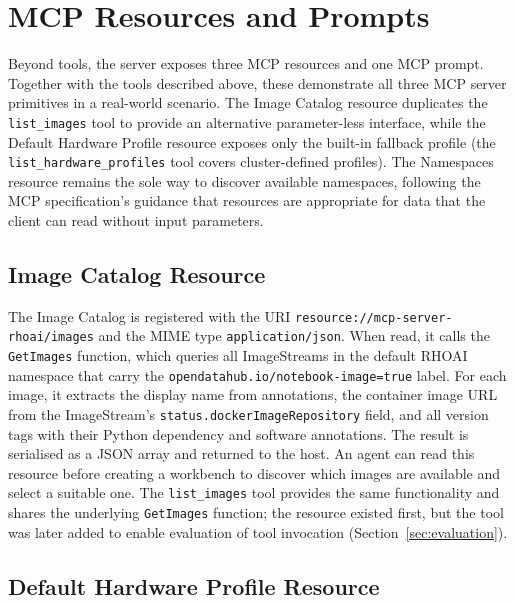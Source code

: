 \documentclass[
  digital,     %
  oneside,     %
  nosansbold,  %
  nocolorbold, %
  lof,         %
  lot,         %
]{fithesis4}
\begin{document}
\section{MCP Resources and Prompts}
\label{sec:resources-prompts}

Beyond tools, the server exposes three MCP resources and one MCP prompt.
Together with the tools described above, these demonstrate all three
MCP server primitives in a real-world scenario. The Image Catalog
resource duplicates the \texttt{list\_images} tool to provide an
alternative parameter-less interface, while the Default Hardware Profile
resource exposes only the built-in fallback profile (the
\texttt{list\_hardware\_profiles} tool covers cluster-defined profiles).
The Namespaces resource remains the sole way to discover available
namespaces, following the MCP specification's guidance that resources
are appropriate for data that the client can read without input
parameters.

\subsection{Image Catalog Resource}
\label{subsec:image-catalog}

\begin{sloppypar}
The Image Catalog is registered with the URI
\texttt{resource://mcp-server-rhoai/\allowbreak images} and the MIME type
\texttt{application/json}. When read, it calls the
\texttt{GetImages} function, which queries all ImageStreams in the default
RHOAI namespace that carry the \texttt{opendatahub.io/\allowbreak notebook-image=true}
label. For each image, it extracts the display name from annotations, the
container image URL from the ImageStream's \texttt{status.docker\-Image\-Repository}
field, and all version tags with their Python dependency and software
annotations. The result is serialised as a JSON array and returned to the
host. An agent can read this resource before creating a workbench to
discover which images are available and select a suitable one. The
\texttt{list\_images} tool provides the same functionality and shares the
underlying \texttt{GetImages} function; the resource existed first, but
the tool was later added to enable evaluation of tool invocation
(Section~\ref{sec:evaluation}).
\end{sloppypar}

\subsection{Default Hardware Profile Resource}
\label{subsec:hw-profiles-resource}
\end{document}
